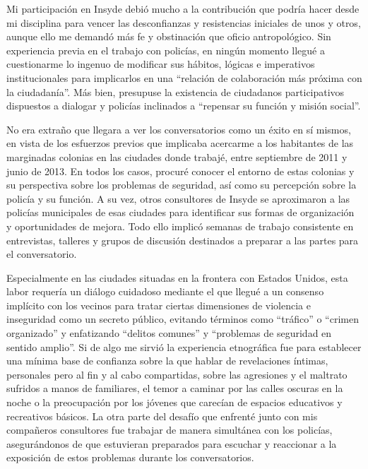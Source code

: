 \documentclass[
  spanish,
  11pt,
  a4paper,
]{scrbook}
\begin{document}
Mi participación en Insyde debió mucho a la contribución que podría
hacer desde mi disciplina para vencer las desconfianzas y resistencias
iniciales de unos y otros, aunque ello me demandó más fe y obstinación
que oficio antropológico. Sin experiencia previa en el trabajo con
policías, en ningún momento llegué a cuestionarme lo ingenuo de
modificar sus hábitos, lógicas e imperativos institucionales para
implicarlos en una ``relación de colaboración más próxima con la
ciudadanía''. Más bien, presupuse la existencia de ciudadanos
participativos dispuestos a dialogar y policías inclinados a ``repensar
su función y misión social''.

No era extraño que llegara a ver los conversatorios como un éxito en sí
mismos, en vista de los esfuerzos previos que implicaba acercarme a los
habitantes de las marginadas colonias en las ciudades donde trabajé,
entre septiembre de 2011 y junio de 2013. En todos los casos, procuré
conocer el entorno de estas colonias y su perspectiva sobre los
problemas de seguridad, así como su percepción sobre la policía y su
función. A su vez, otros consultores de Insyde se aproximaron a las
policías municipales de esas ciudades para identificar sus formas de
organización y oportunidades de mejora. Todo ello implicó semanas de
trabajo consistente en entrevistas, talleres y grupos de discusión
destinados a preparar a las partes para el conversatorio.

Especialmente en las ciudades situadas en la frontera con Estados
Unidos, esta labor requería un diálogo cuidadoso mediante el que llegué
a un consenso implícito con los vecinos para tratar ciertas dimensiones
de violencia e inseguridad como un secreto público, evitando términos
como ``tráfico'' o ``crimen organizado'' y enfatizando ``delitos
comunes'' y ``problemas de seguridad en sentido amplio''. Si de algo me
sirvió la experiencia etnográfica fue para establecer una mínima base de
confianza sobre la que hablar de revelaciones íntimas, personales pero
al fin y al cabo compartidas, sobre las agresiones y el maltrato
sufridos a manos de familiares, el temor a caminar por las calles
oscuras en la noche o la preocupación por los jóvenes que carecían de
espacios educativos y recreativos básicos. La otra parte del desafío que
enfrenté junto con mis compañeros consultores fue trabajar de manera
simultánea con los policías, asegurándonos de que estuvieran preparados
para escuchar y reaccionar a la exposición de estos problemas durante
los conversatorios.
\end{document}
